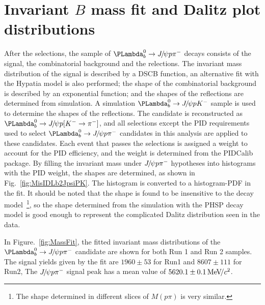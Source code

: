 
\section{Invariant $B$ mass fit and Dalitz plot distributions} 
\label{sec:MassFit}

After the selections, 
the sample of $\LbJpsiPPi$ decays consists of the signal, 
the combinatorial background and the \LbJpsipK relections.
The invariant mass distribution of the signal is described by a DSCB function, 
an alternative fit with the Hypatia model is also performed; 
the shape of the combinatorial background is described by an exponential function; 
and the shapes of the \LbJpsipK reflections are determined from simulation.  
A simulation $\LbJpsipK$ sample is used to determine the shapes of the reflections. 
The candidate is reconstructed as $\Lb\to\jpsi\proton[\Km\to\pim]$, 
and all selections except the PID requirements used to select $\LbJpsiPPi$ candidates in this analysis are applied to these candidates. 
Each event that passes the selections is assigned a weight to account for the PID efficiency, 
and the weight is determined from the PIDCalib package. 
By filling the invariant mass under ${{J\mskip -3mu/\mskip -2mu\psi}}{p}{{\pi}^-}$ hypotheses into histograms with the PID weight, 
the shapes are determined,
as shown in Fig.~\ref{fig:MisIDLb2JpsiPK}. 
The histogram is converted to a histogram-PDF in the fit. 
It should be noted that the shape is found to be insensitive to the decay model\,
\footnote{The shape determined in different slices of $M(p\pi)$ is very similar.}, 
so the shape determined from the simulation with the PHSP decay model
is good enough to represent the complicated Dalitz distribution seen in the data. 

In Figure.~\ref{fig:MassFit}, 
the fitted invariant mass distributions of the $\LbJpsiPPi$ candidate are shown for both Run 1 and Run 2 samples. 
The signal yields given by the fit are $1960\pm53$ for Run1 and $8607\pm111$ for Run2, 
The ${{J\mskip -3mu/\mskip -2mu\psi}} p\pi^-$ signal peak has a mean value of $5620.1\pm0.1\text{\,Me\kern -0.1em V\!/}c^2$.

